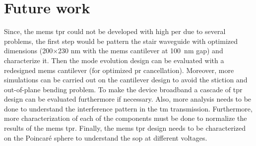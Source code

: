 \documentclass[../report.tex]{subfiles}
\begin{document}
\section{Future work} 
Since, the \gls{mems} \gls{tpr} could not be developed with high \gls{per} due to several problems, the first step would be pattern the stair waveguide with optimized dimensions (200$\times$230 nm with the \gls{mems} cantilever at \SI{100}{\nano \meter} gap) and characterize it. Then the mode evolution design can be evaluated with a redesigned \gls{mems} cantilever (for optimized \gls{pr} cancellation). Moreover, more simulations can be carried out on the cantilever design to avoid the stiction and out-of-plane bending problem. To make the device broadband a cascade of \gls{tpr} design can be evaluated furthermore if necessary. Also, more analysis needs to be done to understand the interference pattern in the \gls{tm} transmission. Furthermore, more characterization of each of the components must be done to normalize the results of the \gls{mems} \gls{tpr}. Finally, the \gls{mems} \gls{tpr} design needs to be characterized on the Poincaré sphere to understand the \gls{sop} at different voltages. 
\end{document}
